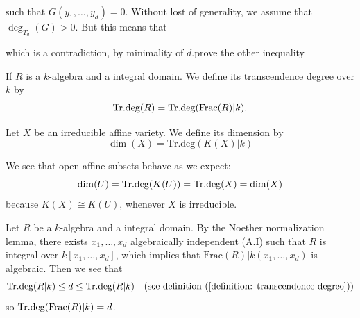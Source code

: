 such that $G(y_1,\dots,y_d)=0$. Without lost of generality, we assume that $\deg_{T_d}(G)>0$. But this means that 
\begin{center}
\end{center}
which is a contradiction, by minimality of $d$.\TODO prove the other inequality

\begin{dang}
    \begin{remark}
        If $R$ is a $k$-algebra and a integral domain. We define its transcendence degree over $k$ by 
        \begin{equation}
            \text{Tr.deg}(R)=\text{Tr.deg}(\text{Frac}(R)|k).
        \end{equation}
    \end{remark}
\end{dang}


\begin{dang}
\begin{definition}
    Let $X$ be an irreducible affine variety. We define its dimension by 
    \begin{equation}
        \dim(X)=\text{Tr.deg}(K(X)|k)
    \end{equation}
\end{definition}
\end{dang}

\begin{remark}
    We see that open affine subsets behave as we expect: 
    \begin{equation}
        \dim(U)=\text{Tr.deg}(K(U))=\text{Tr.deg}(X)=\dim(X)
    \end{equation}
    because $K(X)\cong K(U)$, whenever $X$ is irreducible.
\end{remark}

\begin{dang}
\begin{remark}
    Let $R$ be a $k$-algebra and a integral domain. By the Noether normalization lemma, there exists $x_1,\dots,x_d$ algebraically 
    independent (A.I) such that 
    $R$ is integral over $k[x_1,\dots, x_d]$, which implies that 
    $\text{Frac}(R)|k(x_1,\dots,x_d)$ is algebraic. Then we see that 
    \begin{equation}
        \text{Tr.deg}(R|k) \leq d \leq \text{Tr.deg}(R|k)\quad(\text{see definition~(\ref{definition: transcendence degree})})
    \end{equation}
    so $\text{Tr.deg}(\text{Frac}(R)|k)=d$.
\end{remark}
\end{dang}


